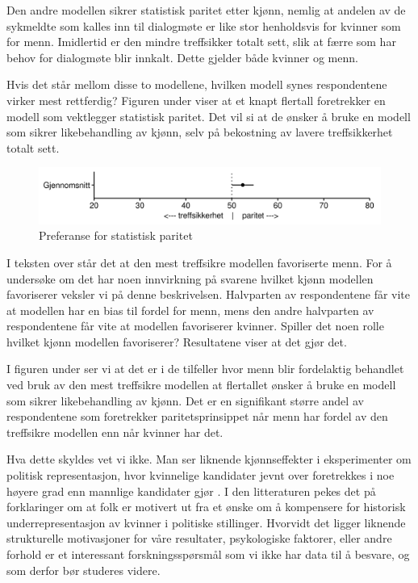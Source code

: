 \documentclass[
  12pt,
  a4paper, 12pt]{article}
\begin{document}
Den andre modellen sikrer statistisk paritet etter kjønn, nemlig at andelen av de sykmeldte som kalles inn til dialogmøte er like stor henholdsvis for kvinner som for menn.
Imidlertid er den mindre treffsikker totalt sett, slik at færre som har behov for dialogmøte blir innkalt.
Dette gjelder både kvinner og menn.

Hvis det står mellom disse to modellene, hvilken modell synes respondentene virker mest rettferdig?
Figuren under viser at et knapt flertall foretrekker en modell som vektlegger statistisk paritet.
Det vil si at de ønsker å bruke en modell som sikrer likebehandling av kjønn, selv på bekostning av lavere treffsikkerhet totalt sett.

\begin{figure}

{\centering \includegraphics[width=0.9\linewidth]{figs/png/fig_parity_avg} 

}

\caption{Preferanse for statistisk paritet}\label{fig:unnamed-chunk-29}
\end{figure}

I teksten over står det at den mest treffsikre modellen favoriserte menn.
For å undersøke om det har noen innvirkning på svarene hvilket kjønn modellen favoriserer veksler vi på denne beskrivelsen.
Halvparten av respondentene får vite at modellen har en bias til fordel for menn, mens den andre halvparten av respondentene får vite at modellen favoriserer kvinner.
Spiller det noen rolle hvilket kjønn modellen favoriserer?
Resultatene viser at det gjør det.

I figuren under ser vi at det er i de tilfeller hvor menn blir fordelaktig behandlet ved bruk av den mest treffsikre modellen at flertallet ønsker å bruke en modell som sikrer likebehandling av kjønn.
Det er en signifikant større andel av respondentene som foretrekker paritetsprinsippet når menn har fordel av den treffsikre modellen enn når kvinner har det.

Hva dette skyldes vet vi ikke.
Man ser liknende kjønnseffekter i eksperimenter om politisk representasjon, hvor kvinnelige kandidater jevnt over foretrekkes i noe høyere grad enn mannlige kandidater gjør \citep{schwarz2018have}.
I den litteraturen pekes det på forklaringer om at folk er motivert ut fra et ønske om å kompensere for historisk underrepresentasjon av kvinner i politiske stillinger.
Hvorvidt det ligger liknende strukturelle motivasjoner for våre resultater, psykologiske faktorer, eller andre forhold er et interessant forskningsspørsmål som vi ikke har data til å besvare, og som derfor bør studeres videre.
\end{document}
